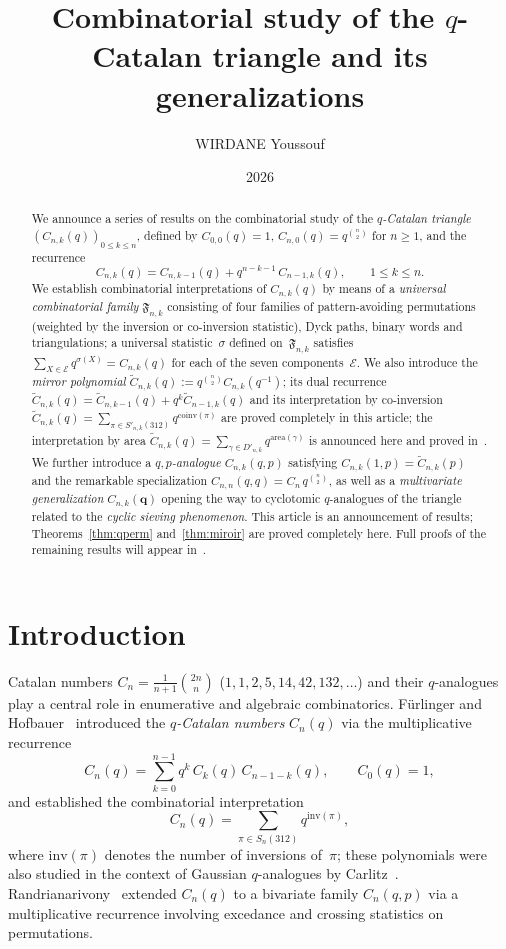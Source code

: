 \documentclass[12pt,a4paper,reqno]{amsart}
\title[Combinatorial study of the $q$-Catalan triangle]
{\large Combinatorial study of the $q$-Catalan triangle
and its generalizations}
\author{WIRDANE Youssouf}
\date{2026}
\theoremstyle{plain}
\theoremstyle{definition}
\newcommand{\Inv}{\mathrm{inv}}
\newcommand{\Coinv}{\mathrm{coinv}}
\newcommand{\Area}{\mathrm{area}}
\newcommand{\Ctilde}{\widetilde{C}}
\newcommand{\bq}{\mathbf{q}}
\begin{document}
\begin{abstract}
We announce a series of results on the combinatorial study
of the \emph{$q$-Catalan triangle}
$(C_{n,k}(q))_{0\le k\le n}$,
defined by $C_{0,0}(q)=1$,
$C_{n,0}(q)=q^{\binom{n}{2}}$ for $n\ge1$,
and the recurrence
\[
C_{n,k}(q)=C_{n,k-1}(q)+q^{n-k-1}\,C_{n-1,k}(q),
\qquad 1\le k\le n.
\]
We establish combinatorial interpretations of $C_{n,k}(q)$
by means of a \emph{universal combinatorial family}
$\mathfrak{F}_{n,k}$ consisting of four families of
pattern-avoiding permutations (weighted by the inversion
or co-inversion statistic), Dyck paths, binary words and triangulations;
a universal statistic~$\sigma$ defined on~$\mathfrak{F}_{n,k}$ satisfies
$\sum_{X\in\mathcal{E}}q^{\sigma(X)}=C_{n,k}(q)$
for each of the seven components~$\mathcal{E}$.
We also introduce the \emph{mirror polynomial}
$\Ctilde_{n,k}(q):=q^{\binom{n}{2}}C_{n,k}(q^{-1})$;
its dual recurrence
$\Ctilde_{n,k}(q)=\Ctilde_{n,k-1}(q)+q^{k}\Ctilde_{n-1,k}(q)$
and its interpretation by co-inversion
$\Ctilde_{n,k}(q)=\sum_{\pi\in S'_{n,k}(312)}q^{\Coinv(\pi)}$
are proved completely in this article;
the interpretation by area
$\Ctilde_{n,k}(q)=\sum_{\gamma\in D'_{n,k}}q^{\Area(\gamma)}$
is announced here and proved in~\cite{W4}.
We further introduce a \emph{$q{,}p$-analogue}
$C_{n,k}(q,p)$ satisfying $C_{n,k}(1,p)=\Ctilde_{n,k}(p)$
and the remarkable specialization $C_{n,n}(q,q)=C_n\,q^{\binom{n}{2}}$,
as well as a \emph{multivariate generalization}
$C_{n,k}(\bq)$ opening the way to cyclotomic $q$-analogues
of the triangle related to the \emph{cyclic sieving phenomenon}.
This article is an announcement of results;
Theorems~\ref{thm:qperm} and~\ref{thm:miroir}
are proved completely here.
Full proofs of the remaining results will appear
in~\cite{W1,W2,W3,W4,W5}.
\end{abstract}
\maketitle
\section{Introduction}\label{sec:intro}
Catalan numbers $C_n = \frac{1}{n+1}\binom{2n}{n}$
($1,1,2,5,14,42,132,\ldots$) and their $q$-analogues play
a central role in enumerative and algebraic combinatorics.
F\"urlinger and Hofbauer~\cite{FH} introduced the
\emph{$q$-Catalan numbers} $C_n(q)$ via the multiplicative recurrence
\begin{equation}\label{eq:carlitz_rec}
C_n(q) = \sum_{k=0}^{n-1} q^k\, C_k(q)\, C_{n-1-k}(q),
\qquad C_0(q)=1,
\end{equation}
and established the combinatorial interpretation
\begin{equation}\label{eq:FH}
C_n(q) = \sum_{\pi\in S_n(312)} q^{\Inv(\pi)},
\end{equation}
where $\Inv(\pi)$ denotes the number of inversions of~$\pi$;
these polynomials were also studied in the context of Gaussian
$q$-analogues by Carlitz~\cite{Carlitz}.
Randrianarivony~\cite{Rand} extended $C_n(q)$ to a bivariate
family $C_n(q,p)$ via a multiplicative recurrence involving
excedance and crossing statistics on permutations.
\end{document}
